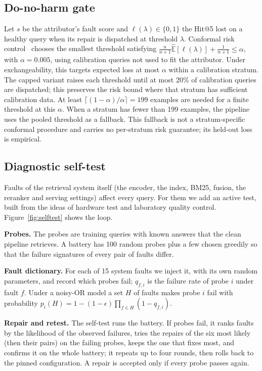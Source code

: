 \documentclass[conference]{IEEEtran}
\begin{document}
\subsection{Do-no-harm gate}\label{sec:gate}
Let $s$ be the attributor's fault score and $\ell(\lambda)\in\{0,1\}$ the Hit@5 lost on a healthy query when its repair is dispatched at threshold $\lambda$. Conformal risk control~\cite{angelopoulos2024crc} chooses the smallest threshold satisfying $\frac{n}{n+1}\hat{\mathbb{E}}[\ell(\lambda)]+\frac{1}{n+1}\le\alpha$, with $\alpha{=}0.005$, using calibration queries not used to fit the attributor. Under exchangeability, this targets expected loss at most $\alpha$ within a calibration stratum. The capped variant raises each threshold until at most 20\% of calibration queries are dispatched; this preserves the risk bound where that stratum has sufficient calibration data. At least $\lceil(1-\alpha)/\alpha\rceil{=}199$ examples are needed for a finite threshold at this $\alpha$. When a stratum has fewer than 199 examples, the pipeline uses the pooled threshold as a fallback. This fallback is not a stratum-specific conformal procedure and carries no per-stratum risk guarantee; its held-out loss is empirical.

\subsection{Diagnostic self-test}\label{sec:selftest}
Faults of the retrieval system itself (the encoder, the index, BM25, fusion, the reranker and serving settings) affect every query. For them we add an active test, built from the ideas of hardware test and laboratory quality control. Figure~\ref{fig:selftest} shows the loop.

\textbf{Probes.} The probes are training queries with known answers that the clean pipeline retrieves. A battery has 100 random probes plus a few chosen greedily so that the failure signatures of every pair of faults differ.

\textbf{Fault dictionary.} For each of 15 system faults we inject it, with its own random parameters, and record which probes fail; $q_{f,i}$ is the failure rate of probe $i$ under fault $f$. Under a noisy-OR model a set $H$ of faults makes probe $i$ fail with probability $p_i(H)=1-(1-\epsilon)\prod_{f\in H}(1-q_{f,i})$.

\textbf{Repair and retest.} The self-test runs the battery. If probes fail, it ranks faults by the likelihood of the observed failures, tries the repairs of the six most likely (then their pairs) on the failing probes, keeps the one that fixes most, and confirms it on the whole battery; it repeats up to four rounds, then rolls back to the pinned configuration. A repair is accepted only if every probe passes again.
\end{document}
